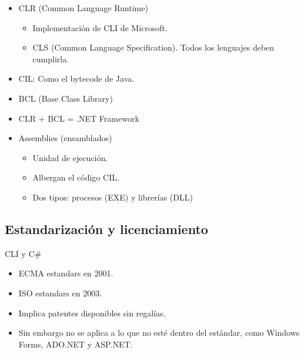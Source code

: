 \documentclass{beamer}
\begin{document}
\begin{frame}[plain]
  \begin{centering}
  \end{centering}
\end{frame}

\begin{frame}
  \begin{itemize}
    \item CLR (Common Language Runtime)
      \begin{itemize}
        \item Implementación de CLI de Microsoft.
        \item CLS (Common Language Specification). Todos los lenguajes deben
          cumplirla.
      \end{itemize}

    \item CIL: Como el bytecode de Java.
    \item BCL (Base Class Library)
    \item CLR + BCL = .NET Framework

    \item Assemblies (ensamblados)
      \begin{itemize}
        \item Unidad de ejecución.
        \item Albergan el código CIL.
        \item Dos tipos: procesos (EXE) y librerías (DLL)
      \end{itemize}
  \end{itemize}
\end{frame}


\subsection{Estandarización y licenciamiento}

\begin{frame}{CLI y C\#}
  \begin{itemize}
    \item ECMA estandars en 2001.
    \item ISO estandars en 2003.
    \item Implica patentes disponibles sin regalías.
    \item Sin embargo no se aplica a lo que no esté dentro del estándar,
      como Windows Forms, ADO.NET y ASP.NET.
  \end{itemize}
\end{frame}
\end{document}
